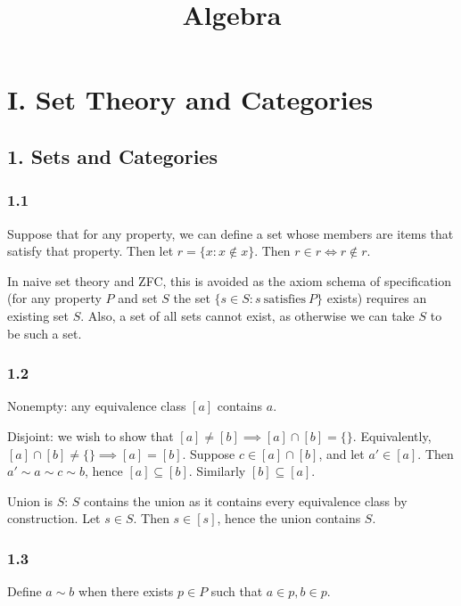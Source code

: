\documentclass{article}
\title{Algebra}
\date{}
\begin{document}
\maketitle

\section*{I. Set Theory and Categories}

\subsection*{1. Sets and Categories}

\subsubsection*{1.1}

Suppose that for any property, we can define a set whose members are items that satisfy that property. Then let $r = \{x : x \not\in x\}$. Then $r \in r \iff r \not\in r$.

In naive set theory and ZFC, this is avoided as the axiom schema of specification (for any property $P$ and set $S$ the set $\{s \in S : s\ \text{satisfies}\ P\}$ exists) requires an existing set $S$. Also, a set of all sets cannot exist, as otherwise we can take $S$ to be such a set.

\subsubsection*{1.2}

Nonempty: any equivalence class $[a]$ contains $a$.

Disjoint: we wish to show that $[a] \ne [b] \implies [a] \cap [b] = \{\}$. Equivalently, $[a] \cap [b] \ne \{\} \implies [a] = [b]$. Suppose $c \in [a] \cap [b]$, and let $a' \in [a]$. Then $a' \sim a \sim c \sim b$, hence $[a] \subseteq [b]$. Similarly $[b] \subseteq [a]$.

Union is $S$: $S$ contains the union as it contains every equivalence class by construction. Let $s \in S$. Then $s \in [s]$, hence the union contains $S$.

\subsubsection*{1.3}

Define $a \sim b$ when there exists $p \in P$ such that $a \in p, b \in p$.
\end{document}
